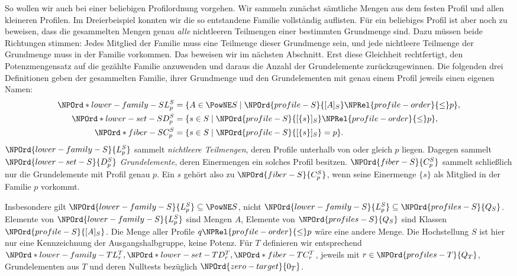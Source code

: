 So wollen wir auch bei einer beliebigen Profilordnung vorgehen.
Wir sammeln zunächst sämtliche Mengen aus dem festen Profil und
allen kleineren Profilen. Im Dreierbeispiel konnten wir die so
entstandene Familie vollständig auflisten. Für ein beliebiges
Profil ist aber noch zu beweisen, dass die gesammelten Mengen
genau \emph{alle} nichtleeren Teilmengen einer bestimmten Grundmenge
sind. Dazu müssen beide Richtungen stimmen: Jedes Mitglied der
Familie muss eine Teilmenge dieser Grundmenge sein, und jede
nichtleere Teilmenge der Grundmenge muss in der Familie vorkommen.
Das beweisen wir im nächsten Abschnitt. Erst diese Gleichheit
rechtfertigt, den Potenzmengensatz auf die gezählte Familie
anzuwenden und daraus die Anzahl der Grundelemente zurückzugewinnen.
Die folgenden drei Definitionen geben der gesammelten Familie,
ihrer Grundmenge und den Grundelementen mit genau einem Profil
jeweils einen eigenen Namen:
\[
 \begin{aligned}
 \NPOrd*{lower-family-S}{L_p^S}&=\{A\in\PowNE S\mid\NPOrd{profile-S}{[A]_S}\NPRel{profile-order}{\le} p\},\\
 \NPOrd*{lower-set-S}{D_p^S}&=\{s\in S\mid\NPOrd{profile-S}{[\{s\}]_S}\NPRel{profile-order}{\le} p\},\\
 \NPOrd*{fiber-S}{C_p^S}&=\{s\in S\mid\NPOrd{profile-S}{[\{s\}]_S}=p\}.
 \end{aligned}
\]
\(\NPOrd{lower-family-S}{L_p^S}\) sammelt \emph{nichtleere Teilmengen}, deren Profile unterhalb
von oder gleich \(p\) liegen. Dagegen sammelt \(\NPOrd{lower-set-S}{D_p^S}\)
\emph{Grundelemente}, deren Einermengen ein solches Profil besitzen.
\(\NPOrd{fiber-S}{C_p^S}\) sammelt schließlich nur die Grundelemente mit Profil genau
\(p\). Ein \(s\) gehört also zu \(\NPOrd{fiber-S}{C_p^S}\), wenn seine Einermenge
\(\{s\}\) als Mitglied in der Familie \(p\) vorkommt.

Insbesondere gilt \(\NPOrd{lower-family-S}{L_p^S}\subseteq\PowNE S\), nicht
\(\NPOrd{lower-family-S}{L_p^S}\subseteq \NPOrd{profiles-S}{Q_S}\). Elemente von \(\NPOrd{lower-family-S}{L_p^S}\) sind Mengen \(A\),
Elemente von \(\NPOrd{profiles-S}{Q_S}\) sind Klassen \(\NPOrd{profile-S}{[A]_S}\). Die Menge aller Profile
\(q\NPRel{profile-order}{\le} p\) wäre eine andere Menge. Die Hochstellung \(S\) ist hier
nur eine Kennzeichnung der Ausgangshalbgruppe, keine Potenz.
Für \(T\) definieren wir entsprechend \(\NPOrd*{lower-family-T}{L_r^T},\NPOrd*{lower-set-T}{D_r^T},\NPOrd*{fiber-T}{C_r^T}\),
jeweils mit \(r\in \NPOrd{profiles-T}{Q_T}\), Grundelementen aus \(T\) und deren
Nulltests bezüglich \(\NPOrd{zero-target}{0_T}\).

